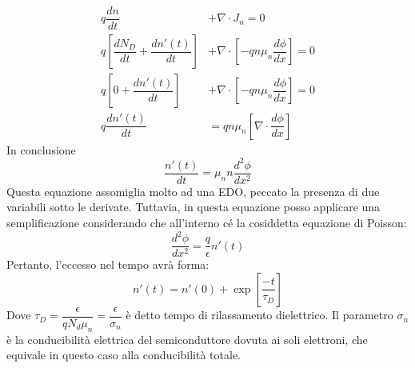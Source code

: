 %
\begin{align}
    q \dfrac{dn}{dt} &+\nabla \cdot J_n=0\\
    q \left[ \dfrac{dN_D}{dt} + \dfrac{dn'(t)}{dt}\right] &+ \nabla \cdot \left[ -qn\mu_n \dfrac{d\phi}{dx} \right] = 0 \nonumber\\
    q \left[ 0 + \dfrac{dn'(t)}{dt}\right] &+ \nabla \cdot \left[ -qn\mu_n \dfrac{d\phi}{dx} \right] = 0 \nonumber\\
    q \dfrac{dn'(t)}{dt} &= qn \mu_n \left[ \nabla \cdot \dfrac{d\phi}{dx} \right] \nonumber
\end{align}
%
In conclusione 
%
\begin{equation}
    \dfrac{n'(t)}{dt}=\mu_n n \dfrac{d^2 \phi}{dx^2}
\end{equation}
%
Questa equazione assomiglia molto ad una EDO, peccato la presenza di due variabili sotto le derivate.
Tuttavia, in questa equazione posso applicare una semplificazione considerando che all'interno cé la cosiddetta equazione di Poisson:
%
\begin{equation}
    \dfrac{d^2 \phi}{dx^2} = \dfrac{q}{\epsilon}n'(t)
\end{equation}
%
Pertanto, l'eccesso nel tempo avrà forma:
%
\begin{equation}
    n'(t)=n'(0)+\exp \left[ \frac{-t}{\tau_D} \right]
\end{equation}
%
Dove $\tau_D= \dfrac{\epsilon}{qN_d \mu_n}= \dfrac{\epsilon}{\sigma_n}$ è detto tempo di
rilassamento dielettrico. Il parametro $\sigma_n$ è la conducibilità elettrica del
semiconduttore dovuta ai soli elettroni, che equivale in questo caso alla 
conducibilità totale.\\
%

